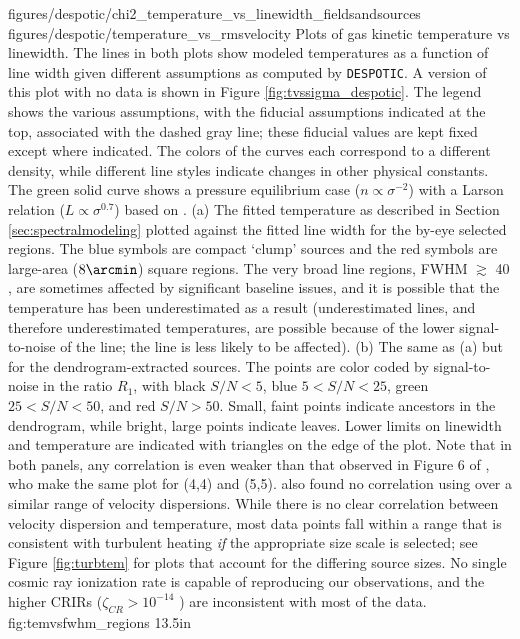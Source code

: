 \FigureTwo
{figures/despotic/chi2_temperature_vs_linewidth_fieldsandsources} %
{figures/despotic/temperature_vs_rmsvelocity} %
{
Plots of gas kinetic temperature vs linewidth.  The lines in both plots show
modeled temperatures as a function of line width given different assumptions as
computed by \texttt{DESPOTIC}.  
A version of this plot with no data is shown in Figure
\ref{fig:tvssigma_despotic}.
The legend
shows the various assumptions, with the fiducial assumptions indicated at the
top, associated with the dashed gray line; these fiducial values are kept fixed
except where indicated.  The colors of the curves each correspond to a
different density, while different line styles indicate changes in other
physical constants.  The green solid curve shows a pressure equilibrium case
($n\propto\sigma^{-2}$) with a Larson relation ($L\propto\sigma^{0.7}$) based
on \citet{Shetty2012a}.
(a) 
The fitted temperature as described in Section \ref{sec:spectralmodeling} plotted
against the fitted line width for the by-eye selected regions.  The blue
symbols are compact `clump' sources and the red symbols are large-area
($8\arcmin$) square regions.  The very broad line regions, FWHM $\gtrsim$ 40
\kms, are sometimes affected by significant baseline issues, and it is possible
that the temperature has been underestimated as a result (underestimated
\threetwoone lines, and therefore underestimated temperatures, are possible
because of the lower signal-to-noise of the \threetwoone line; the
\threeohthree line is less likely to be affected).
(b) The same as (a) but for the dendrogram-extracted sources. The points are
color coded by signal-to-noise in the ratio $R_1$, with black $S/N < 5$, blue
$5 < S/N < 25$, green $25 < S/N < 50$, and red $S/N > 50$.  Small, faint points
indicate ancestors in the dendrogram, while bright, large points indicate leaves.
Lower limits on linewidth and temperature are indicated with triangles on the
edge of the plot.  
Note that in both panels, any correlation is even weaker than that observed in
Figure 6 of \citet{Huettemeister1993a}, who make the same plot for \ammonia (4,4)
and (5,5).  \citet{Riquelme2013a} also found no correlation using \ammonia over a similar
range of velocity dispersions.
While there is no clear correlation between velocity dispersion and
temperature, most data points fall within a range that is consistent with
turbulent heating \emph{if} the appropriate size scale is selected; see Figure
\ref{fig:turbtem} for plots that account for the differing source sizes.
No single cosmic ray ionization rate is
capable of reproducing our observations, and the higher CRIRs ($\zeta_{CR} >
10^{-14}$ \pers) are inconsistent with most of the data.
}
{fig:temvsfwhm_regions}
{1}{3.5in}

